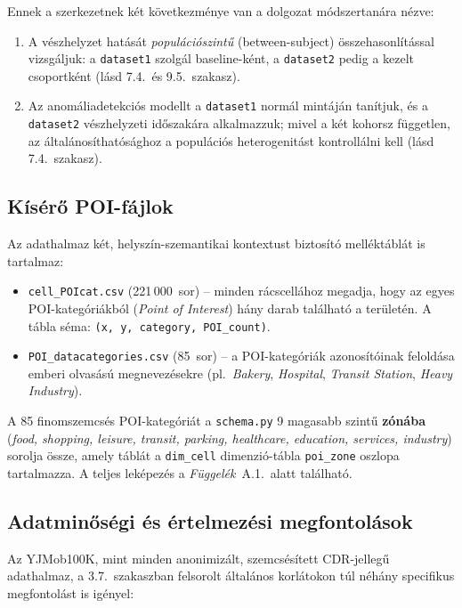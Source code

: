 Ennek a szerkezetnek két következménye van a dolgozat módszertanára nézve:
\begin{enumerate}
    \item A vészhelyzet hatását \emph{populációszintű} (between-subject) összehasonlítással vizsgáljuk: a \texttt{dataset1} szolgál baseline-ként, a \texttt{dataset2} pedig a kezelt csoportként (lásd 7.4.\ és 9.5.\ szakasz).
    \item Az anomáliadetekciós modellt a \texttt{dataset1} normál mintáján tanítjuk, és a \texttt{dataset2} vészhelyzeti időszakára alkalmazzuk; mivel a két kohorsz független, az általánosíthatósághoz a populációs heterogenitást kontrollálni kell (lásd 7.4.\ szakasz).
\end{enumerate}

\subsection{Kísérő POI-fájlok}

Az adathalmaz két, helyszín-szemantikai kontextust biztosító melléktáblát is tartalmaz:
\begin{itemize}
    \item \texttt{cell\_POIcat.csv} (221\,000~sor) -- minden rácscellához megadja, hogy az egyes POI-kategóriákból (\textit{Point of Interest}) hány darab található a területén. A tábla séma: \texttt{(x, y, category, POI\_count)}.
    \item \texttt{POI\_datacategories.csv} (85~sor) -- a POI-kategóriák azonosítóinak feloldása emberi olvasású megnevezésekre (pl.\ \emph{Bakery}, \emph{Hospital}, \emph{Transit Station}, \emph{Heavy Industry}).
\end{itemize}

A 85 finomszemcsés POI-kategóriát a \texttt{schema.py} 9 magasabb szintű \textbf{zónába} (\textit{food, shopping, leisure, transit, parking, healthcare, education, services, industry}) sorolja össze, amely táblát a \texttt{dim\_cell} dimenzió-tábla \texttt{poi\_zone} oszlopa tartalmazza. A teljes leképezés a \emph{Függelék}~A.1.\ alatt található.

\subsection{Adatminőségi és értelmezési megfontolások}

Az YJMob100K, mint minden anonimizált, szemcsésített CDR-jellegű adathalmaz, a 3.7.\ szakaszban felsorolt általános korlátokon túl néhány specifikus megfontolást is igényel:

